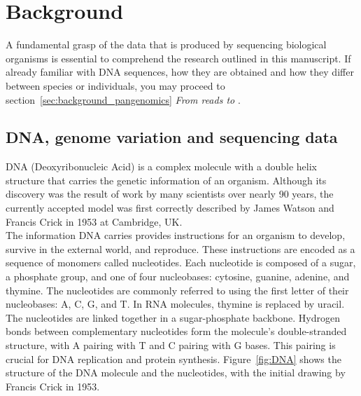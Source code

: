 \chapter{Background}
\label{sec:background}

A fundamental grasp of the data that is produced by sequencing biological organisms is essential to comprehend the research outlined in this manuscript. If already familiar with DNA sequences, how they are obtained and how they differ between species or individuals, you may proceed to section~\ref{sec:background_pangenomics} \emph{From reads to \kmers}.
\section{DNA, genome variation and sequencing data}
\label{sec:dna}
DNA (Deoxyribonucleic Acid) is a complex molecule with a double helix structure that carries the genetic information of an organism. Although its discovery was the result of work by many scientists over nearly 90 years, the currently accepted model was first correctly described by James Watson and Francis Crick in 1953 at Cambridge, UK.\\
The information DNA carries provides instructions for an organism to develop, survive in the external world, and reproduce. These instructions are encoded as a sequence of monomers called nucleotides. Each nucleotide is composed of a sugar, a phosphate group, and one of four nucleobases: cytosine, guanine, adenine, and thymine. The nucleotides are commonly referred to using the first letter of their nucleobases: A, C, G, and T. In RNA molecules, thymine is replaced by uracil.\\
The nucleotides are linked together in a sugar-phosphate backbone. Hydrogen bonds between complementary nucleotides form the molecule's double-stranded structure, with A pairing with T and C pairing with G bases. This pairing is crucial for DNA replication and protein synthesis. Figure~\ref{fig:DNA} shows the structure of the DNA molecule and the nucleotides, with the initial drawing by Francis Crick in 1953.
